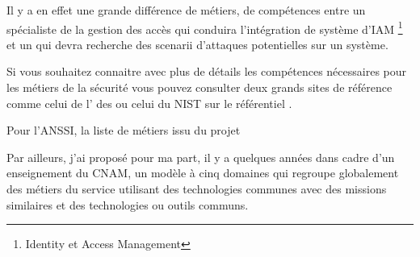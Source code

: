 Il y a en effet une grande différence de métiers, de compétences entre un spécialiste de la gestion des accès  qui conduira l'intégration de système d'IAM  \footnote{Identity et Access Management} et un  qui devra recherche des scenarii d'attaques potentielles sur un système. 






Si vous souhaitez connaitre avec plus de détails les compétences nécessaires pour les métiers de la sécurité vous pouvez consulter deux grands sites de référence comme celui de l' des 
  ou celui du NIST sur le référentiel  .
 
 Pour l'ANSSI, la liste de métiers issu du projet 
 
Par ailleurs,  j'ai proposé pour ma part, il y a quelques années dans cadre d'un enseignement du CNAM, un modèle à cinq domaines qui regroupe globalement des métiers du service utilisant des technologies communes avec des  missions similaires et des technologies ou outils communs.
 
